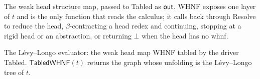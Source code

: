 \begin{algorithm*}
  \DontPrintSemicolon
  \caption{The weak head structure map, passed to \textsf{Tabled} as $\outm$. \textsf{WHNF} exposes one layer of $t$ and is the only function that reads the calculus; it calls back through \textsf{Resolve} to reduce the head, $\beta$-contracting a head redex and continuing, stopping at a rigid head or an abstraction, or returning $\bot$ when the head has no whnf.}
  \label{alg:whnfmap}
\end{algorithm*}

\begin{algorithm}
  \DontPrintSemicolon
  \caption{The L\'evy--Longo evaluator: the weak head map \textsf{WHNF} tabled by the driver \textsf{Tabled}. $\textsf{TabledWHNF}(t)$ returns the graph whose unfolding is the L\'evy--Longo tree of $t$.}
  \label{alg:solvewhnf}
\end{algorithm}

